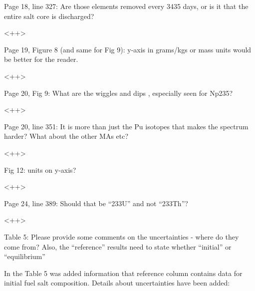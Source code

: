 \documentclass[answers,11pt]{exam}
\begin{document}
\begin{questions}
        \question  Page 18, line 327: Are those elements removed every 3435 
        days, or is it that the entire salt core is discharged?
        \begin{solution}
                <++>
        \end{solution}

        \question  Page 19, Figure 8 (and same for Fig 9): y-axis in grams/kgs 
        or mass units would be better for the reader.
        \begin{solution}
                <++>
        \end{solution}

        \question  Page 20, Fig 9: What are the wiggles and dips , especially 
        seen for Np235?
        \begin{solution}
                <++>
        \end{solution}

        \question  Page 20, line 351: It is more than just the Pu isotopes that 
        makes the spectrum harder? What about the other MAs etc?
        \begin{solution}
                <++>
        \end{solution}

        \question  Fig 12: units on y-axis?
        \begin{solution}
                <++>
        \end{solution}

        \question  Page 24, line 389: Should that be ``233U'' and not ``233Th''?
        \begin{solution}
                <++>
        \end{solution}

        \question  Table 5: Please provide some comments on the uncertainties - 
        where do they come from? Also, the ``reference'' results need to state 
        whether ``initial'' or ``equilibrium''
        \begin{solution}
                In the Table 5 was added information that reference column contains 
                data for initial fuel salt composition. Details about uncertainties
                 have been added:
                

\end{solution}
\end{questions}
\end{document}
